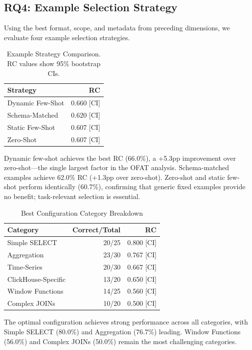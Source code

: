 \documentclass[sigconf, nonacm]{acmart}
\begin{document}
\subsection{RQ4: Example Selection Strategy}

Using the best format, scope, and metadata from preceding dimensions, we evaluate four example selection strategies.

\begin{table}[t]
\caption{Example Strategy Comparison. RC values show 95\% bootstrap CIs.}
\label{tab:examples}
\centering
\small
\begin{tabular}{lr}
\toprule
\textbf{Strategy} & \textbf{RC} \\
\midrule
Dynamic Few-Shot & 0.660 [CI] \\
Schema-Matched & 0.620 [CI] \\
Static Few-Shot & 0.607 [CI] \\
Zero-Shot & 0.607 [CI] \\
\bottomrule
\end{tabular}
\end{table}

Dynamic few-shot achieves the best RC (66.0\%), a +5.3pp improvement over zero-shot---the single largest factor in the OFAT analysis. Schema-matched examples achieve 62.0\% RC (+1.3pp over zero-shot). Zero-shot and static few-shot perform identically (60.7\%), confirming that generic fixed examples provide no benefit; task-relevant selection is essential.

\begin{table}[t]
\caption{Best Configuration Category Breakdown}
\label{tab:categories-best}
\centering
\small
\begin{tabular}{lrr}
\toprule
\textbf{Category} & \textbf{Correct/Total} & \textbf{RC} \\
\midrule
Simple SELECT & 20/25 & 0.800 [CI] \\
Aggregation & 23/30 & 0.767 [CI] \\
Time-Series & 20/30 & 0.667 [CI] \\
ClickHouse-Specific & 13/20 & 0.650 [CI] \\
Window Functions & 14/25 & 0.560 [CI] \\
Complex JOINs & 10/20 & 0.500 [CI] \\
\bottomrule
\end{tabular}
\end{table}

The optimal configuration achieves strong performance across all categories, with Simple SELECT (80.0\%) and Aggregation (76.7\%) leading. Window Functions (56.0\%) and Complex JOINs (50.0\%) remain the most challenging categories.
\end{document}
